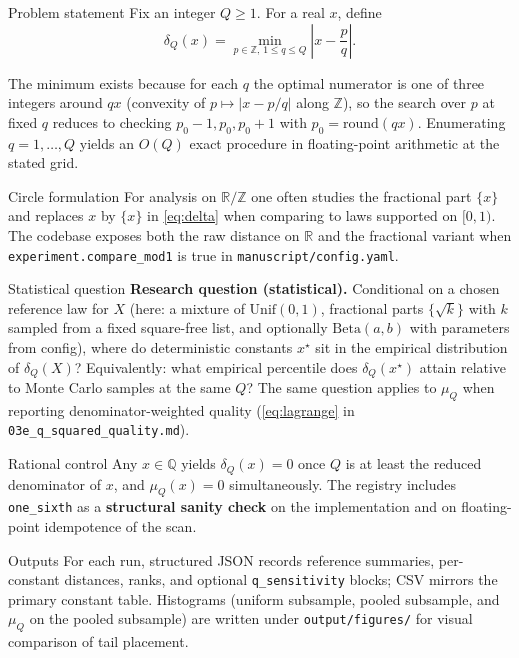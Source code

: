 \documentclass[
  ignorenonframetext,
]{beamer}
\author{\texorpdfstring{}{}}
\date{}
\begin{document}
\begin{frame}[fragile]{Problem statement}
\protect{}\label{problem-statement}
Fix an integer \(Q \geq 1\). For a real \(x\), define \begin{equation}
\label{eq:delta}
\delta_Q(x) = \min_{p \in \mathbb{Z},\, 1 \leq q \leq Q} \left| x - \frac{p}{q} \right|.
\end{equation}

The minimum exists because for each \(q\) the optimal numerator is one
of three integers around \(qx\) (convexity of \(p \mapsto |x-p/q|\)
along \(\mathbb{Z}\)), so the search over \(p\) at fixed \(q\) reduces
to checking \(p_0-1,p_0,p_0+1\) with \(p_0=\mathrm{round}(qx)\).
Enumerating \(q=1,\ldots,Q\) yields an \(O(Q)\) exact procedure in
floating-point arithmetic at the stated grid.

\begin{block}{Circle formulation}
\protect{}\label{circle-formulation}
For analysis on \(\mathbb{R}/\mathbb{Z}\) one often studies the
fractional part \(\{x\}\) and replaces \(x\) by \(\{x\}\) in
\eqref{eq:delta} when comparing to laws supported on \([0,1)\). The
codebase exposes both the raw distance on \(\mathbb{R}\) and the
fractional variant when \texttt{experiment.compare\_mod1} is true in
\texttt{manuscript/config.yaml}.
\end{block}

\begin{block}{Statistical question}
\protect{}\label{statistical-question}
\textbf{Research question (statistical).} Conditional on a chosen
reference law for \(X\) (here: a mixture of \(\mathrm{Unif}(0,1)\),
fractional parts \(\{\sqrt{k}\}\) with \(k\) sampled from a fixed
square-free list, and optionally \(\mathrm{Beta}(a,b)\) with parameters
from config), where do deterministic constants \(x^\star\) sit in the
empirical distribution of \(\delta_Q(X)\)? Equivalently: what empirical
percentile does \(\delta_Q(x^\star)\) attain relative to Monte Carlo
samples at the same \(Q\)? The same question applies to \(\mu_Q\) when
reporting denominator-weighted quality (\eqref{eq:lagrange} in
\texttt{03e\_q\_squared\_quality.md}).
\end{block}

\begin{block}{Rational control}
\protect{}\label{rational-control}
Any \(x \in \mathbb{Q}\) yields \(\delta_Q(x)=0\) once \(Q\) is at least
the reduced denominator of \(x\), and \(\mu_Q(x)=0\) simultaneously. The
registry includes \texttt{one\_sixth} as a \textbf{structural sanity
check} on the implementation and on floating-point idempotence of the
scan.
\end{block}

\begin{block}{Outputs}
\protect{}\label{outputs}
For each run, structured JSON records reference summaries, per-constant
distances, ranks, and optional \texttt{q\_sensitivity} blocks; CSV
mirrors the primary constant table. Histograms (uniform subsample,
pooled subsample, and \(\mu_Q\) on the pooled subsample) are written
under \texttt{output/figures/} for visual comparison of tail placement.
\end{block}
\end{frame}
\end{document}
